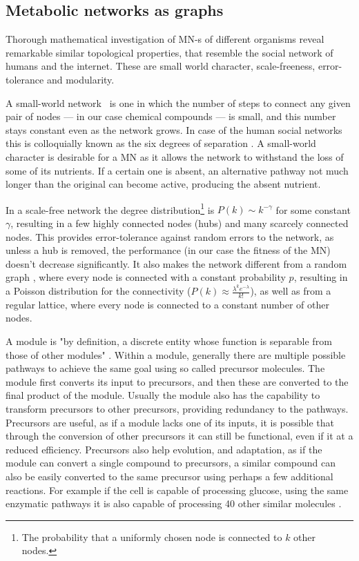 \documentclass[a4paper,12pt]{article}
\begin{document}
	\subsection{Metabolic networks as graphs}
	Thorough mathematical investigation of MN-s of different organisms reveal remarkable similar topological properties, that resemble the social network of humans and the internet. These are small world character, scale-freeness, error-tolerance and modularity\cite{largescale}.	

	A small-world network \cite{smallworld}~is one in which the number of steps to connect any given pair of nodes --- in our case chemical compounds --- is small, and this number stays constant even as the network grows. In case of the human social networks this is colloquially known as the six degrees of separation \cite{sixdegrees}. A small-world character is desirable for a MN as it allows the network to withstand the loss of some of its nutrients. If a certain one is absent, an alternative pathway not much longer than the original can become active, producing the absent nutrient. %
	 
	In a scale-free network the degree distribution\footnote{The probability that a uniformly chosen node is connected to $k$ other nodes.} is $P(k)\sim k^{-\gamma}$ for some constant $\gamma$, resulting in a few highly connected nodes (hubs) and many scarcely connected nodes. This provides error-tolerance against random errors to the network, as unless a hub is removed, the performance (in our case the fitness of the MN) doesn't decrease significantly. It also makes the network different from a random graph \cite{randomgraphs}, where every node is connected with a constant probability $p$, resulting in a Poisson distribution for the connectivity ($P(k) \approx \frac{\lambda^k e^{-\lambda}}{k!} $), as well as from a regular lattice, where every node is connected to a constant number of other nodes.
	 
	A module is "by definition, a discrete entity whose function is separable from those of other modules" \cite{modulardef}. Within a module, generally there are multiple possible pathways to achieve the same goal using so called precursor molecules. The module first converts its input to precursors, and then these are converted to the final product of the module. Usually the module also has the capability to transform precursors to other precursors, providing redundancy to the pathways. Precursors are useful, as if a module lacks one of its inputs, it is possible that through the conversion of other precursors it can still be functional, even if it at a reduced efficiency. Precursors also help evolution, and adaptation, as if the module can convert a single compound to precursors, a similar compound can also be easily converted to the same precursor using perhaps a few additional reactions. For example if the cell is capable of processing glucose, using the same enzymatic pathways it is also capable of processing 40 other similar molecules \cite{latent}.
	
\end{document}
